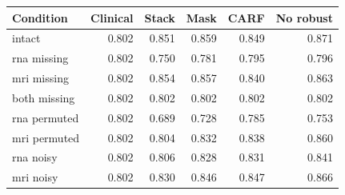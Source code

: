 \begin{tabular}{lrrrrr}
\toprule
Condition & Clinical & Stack & Mask & CARF & No robust\\
\midrule
intact & 0.802 & 0.851 & 0.859 & 0.849 & 0.871\\
rna missing & 0.802 & 0.750 & 0.781 & 0.795 & 0.796\\
mri missing & 0.802 & 0.854 & 0.857 & 0.840 & 0.863\\
both missing & 0.802 & 0.802 & 0.802 & 0.802 & 0.802\\
rna permuted & 0.802 & 0.689 & 0.728 & 0.785 & 0.753\\
mri permuted & 0.802 & 0.804 & 0.832 & 0.838 & 0.860\\
rna noisy & 0.802 & 0.806 & 0.828 & 0.831 & 0.841\\
mri noisy & 0.802 & 0.830 & 0.846 & 0.847 & 0.866\\
\bottomrule
\end{tabular}
